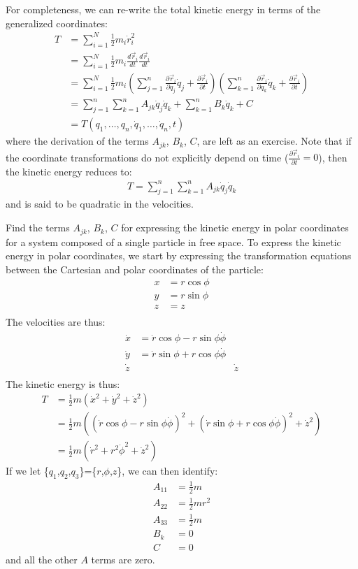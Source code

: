 For completeness, we can re-write the total kinetic energy in terms of the generalized coordinates:
\begin{align}
T&=\sum_{i=1}^N\frac{1}{2}m_i\dot{r}_i^2\nonumber\\
&=\sum_{i=1}^N\frac{1}{2}m_i\frac{d\vec{r}_i}{dt}\frac{d\vec{r}_i}{dt}\nonumber\\
&=\sum_{i=1}^N\frac{1}{2}m_i\left(\sum_{j=1}^n\frac{\partial\vec{r}_i}{\partial q_j}\dot{q}_j+\frac{\partial\vec{r}_i}{\partial t} \right) \left( \sum_{k=1}^n\frac{\partial\vec{r}_i}{\partial q_k}\dot{q}_k+\frac{\partial\vec{r}_i}{\partial t}\right)\nonumber\\
&=\sum_{j=1}^n\sum_{k=1}^n A_{jk}\dot{q}_j\dot{q}_k+\sum_{k=1}^n B_{k}\dot{q}_k +C\nonumber\\
&=T(q_1,\dots ,q_n, \dot{q}_1, \dots, \dot{q}_n,t)
\label{eqn:genT}
\end{align}
where the derivation of the terms $A_{jk}$, $B_k$, $C$, are left as an exercise. Note that if the coordinate transformations do not explicitly depend on time ($\frac{\partial\vec{r}_i}{\partial t}=0$), then the kinetic energy reduces to:
\begin{align}
T=\sum_{j=1}^n\sum_{k=1}^n A_{jk}\dot{q}_j\dot{q}_k
\end{align}
and is said to be quadratic in the velocities.
\begin{example}{0pt}{Find the terms $A_{jk}$, $B_k$, $C$ for expressing the kinetic energy in polar coordinates for a system composed of a single particle in free space.}{}
To express the kinetic energy in polar coordinates, we start by expressing the transformation equations between the Cartesian and polar coordinates of the particle:
\begin{align*}
x&=r\cos\phi\\
y&=r\sin\phi\\
z&=z\\
\end{align*}
The velocities are thus:
\begin{align*}
\dot x&=\dot r\cos\phi-r\sin\phi\dot\phi\\
\dot y&=\dot r\sin\phi+r\cos\phi\dot\phi\\
\dot z&&\dot z\\
\end{align*}
The kinetic energy is thus:
\begin{align*}
T&=\frac{1}{2}m(\dot x^2+\dot y^2+\dot z^2)\\
&=\frac{1}{2}m \left( (\dot r\cos\phi-r\sin\phi\dot\phi)^2+(\dot r\sin\phi+r\cos\phi\dot\phi)^2+\dot z^2    \right)\\
&=\frac{1}{2}m (\dot r^2+r^2\dot\phi^2+\dot z^2)
\end{align*}
If we let \{$q_1$,$q_2$,$q_3$\}=\{$r$,$\phi$,$z$\}, we can then identify:
\begin{align*}
A_{11}&=\frac{1}{2}m\\
A_{22}&=\frac{1}{2}mr^2\\
A_{33}&=\frac{1}{2}m\\
B_k&=0\\
C&=0
\end{align*}
and all the other $A$ terms are zero.

\end{example}
 
